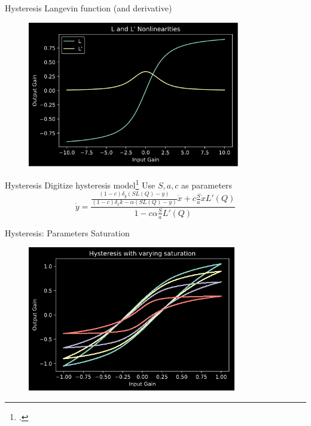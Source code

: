 \begin{frame}{Hysteresis}
    Langevin function (and derivative)
    \begin{figure}
        \includegraphics[height=2.5in]{../Hysteresis/Pics/LangevinPlot}
    \end{figure}
\end{frame}

\begin{frame}{Hysteresis}
    Digitize hysteresis model\footcite{Transformers_JA,DAFX-tape}
    \newline\newline
    Use $S, a, c$ as parameters
    \vspace{2ex}
    \begin{equation}
        \dot{y} = \frac{\frac{(1-c)\delta_y(SL(Q) - y)}{(1-c)\delta_xk - \alpha(SL(Q) - y)}\dot{x} + c \frac{S}{a} \dot{x} L'(Q)}{1 - c\alpha \frac{S}{a} L'(Q)}
    \end{equation}
\end{frame}

\begin{frame}{Hysteresis: Parameters}
    Saturation
    \begin{figure}
        \includegraphics[height=2.5in]{../Hysteresis/Pics/Saturations}
    \end{figure}
\end{frame}


